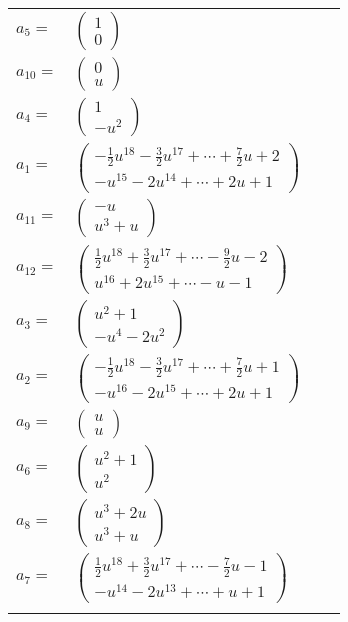 \documentclass[1p]{elsarticle_modified}
\theoremstyle{definition}
\begin{document}
\begin{tabular}{m{7pt} m{180pt} m{7pt} m{180pt} }
\flushright $a_{5}=$&$\begin{pmatrix}1\\0\end{pmatrix}$ \\
\flushright $a_{10}=$&$\begin{pmatrix}0\\u\end{pmatrix}$ \\
\flushright $a_{4}=$&$\begin{pmatrix}1\\- u^2\end{pmatrix}$ \\
\flushright $a_{1}=$&$\begin{pmatrix}-\frac{1}{2} u^{18}-\frac{3}{2} u^{17}+\cdots+\frac{7}{2} u+2\\- u^{15}-2 u^{14}+\cdots+2 u+1\end{pmatrix}$ \\
\flushright $a_{11}=$&$\begin{pmatrix}- u\\u^3+u\end{pmatrix}$ \\
\flushright $a_{12}=$&$\begin{pmatrix}\frac{1}{2} u^{18}+\frac{3}{2} u^{17}+\cdots-\frac{9}{2} u-2\\u^{16}+2 u^{15}+\cdots- u-1\end{pmatrix}$ \\
\flushright $a_{3}=$&$\begin{pmatrix}u^2+1\\- u^4-2 u^2\end{pmatrix}$ \\
\flushright $a_{2}=$&$\begin{pmatrix}-\frac{1}{2} u^{18}-\frac{3}{2} u^{17}+\cdots+\frac{7}{2} u+1\\- u^{16}-2 u^{15}+\cdots+2 u+1\end{pmatrix}$ \\
\flushright $a_{9}=$&$\begin{pmatrix}u\\u\end{pmatrix}$ \\
\flushright $a_{6}=$&$\begin{pmatrix}u^2+1\\u^2\end{pmatrix}$ \\
\flushright $a_{8}=$&$\begin{pmatrix}u^3+2 u\\u^3+u\end{pmatrix}$ \\
\flushright $a_{7}=$&$\begin{pmatrix}\frac{1}{2} u^{18}+\frac{3}{2} u^{17}+\cdots-\frac{7}{2} u-1\\- u^{14}-2 u^{13}+\cdots+u+1\end{pmatrix}$\\&\end{tabular}
\end{document}
